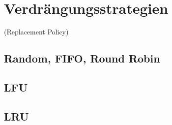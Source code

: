 \section{Verdrängungsstrategien}
(Replacement Policy)
\subsection{Random, FIFO, Round Robin}
\subsection{LFU}
\subsection{LRU}
